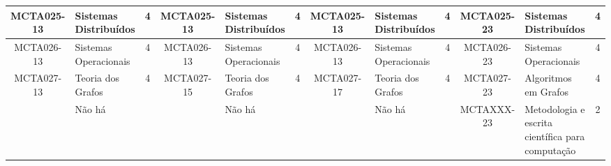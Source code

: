 \begin{landscape}
{\begin{longtable}{|c|p{.2\textheight}|c||c|p{.2\textheight}|c||c|p{.2\textheight}|c||c|p{.2\textheight}|c|}
    MCTA025-13 & Sistemas Distribuídos & 4 &
    MCTA025-13 & Sistemas Distribuídos & 4 & 
    MCTA025-13 & Sistemas Distribuídos & 4 & 
    MCTA025-23 & Sistemas Distribuídos & 4 \\ \hline

    MCTA026-13 & Sistemas Operacionais & 4 & 
    MCTA026-13 & Sistemas Operacionais & 4 & 
    MCTA026-13 & Sistemas Operacionais & 4 & 
    MCTA026-23 & Sistemas Operacionais & 4 \\ \hline

    MCTA027-13 & Teoria dos Grafos & 4 &
    MCTA027-15 & Teoria dos Grafos & 4 &
    MCTA027-17 & Teoria dos Grafos & 4 &
    MCTA027-23 & Algoritmos em Grafos & 4 \\ \hline

    & Não há & &
    & Não há & & 
    & Não há & & 
    MCTAXXX-23 & Metodologia e escrita científica para computação & 2 \\ \hline

\end{longtable}
}
\end{landscape}


